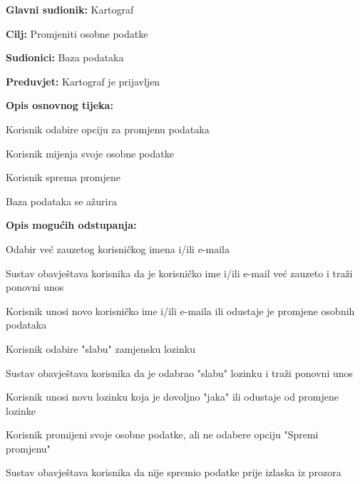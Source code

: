 					\noindent {}
					\begin{packed_item}
						
						\item \textbf{Glavni sudionik: }Kartograf
						\item  \textbf{Cilj:} Promjeniti osobne podatke
						\item  \textbf{Sudionici:} Baza podataka
						\item  \textbf{Preduvjet:} Kartograf je prijavljen
						\item  \textbf{Opis osnovnog tijeka:}
						
						\item[] \begin{packed_enum}
							
							\item Korisnik odabire opciju za promjenu podataka
							\item Korisnik mijenja svoje osobne podatke
							\item Korisnik sprema promjene
							\item Baza podataka se ažurira
						\end{packed_enum}
						
						\item  \textbf{Opis mogućih odstupanja:}
						
						\item[] \begin{packed_item}
							
							\item Odabir već zauzetog korisničkog imena i/ili e-maila
							\item[] \begin{packed_enum}
								
								\item Sustav obavještava korisnika da je korisničko ime i/ili e-mail već zauzeto i traži ponovni unos
								\item Korisnik unosi novo korisničko ime i/ili e-maila ili odustaje je promjene osobnih podataka
								
							\end{packed_enum}
							\item Korisnik odabire "slabu" zamjensku lozinku
							\item[] \begin{packed_enum}
								\item Sustav obavještava korisnika da je odabrao "slabu" lozinku i traži ponovni unos
								\item Korisnik unosi novu lozinku koja je dovoljno "jaka" ili odustaje od promjene lozinke
							\end{packed_enum}
							\item Korisnik promijeni svoje osobne podatke, ali ne odabere opciju "Spremi promjenu"
							\item[] \begin{packed_enum}
								\item Sustav obavještava korisnika da nije spremio podatke prije izlaska iz prozora
							\end{packed_enum}
							

\end{packed_item}
\end{packed_item}
